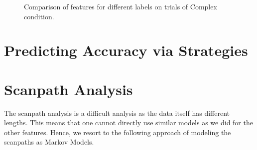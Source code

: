 \begin{figure}
\begin{floatrow}
{    \caption{Comparison of features for different labels on trials of Complex condition.}
    \label{fig:barchart_complex}
}
\end{floatrow}
\begin{floatrow}
\end{floatrow}
\end{figure}


\section{Predicting Accuracy via Strategies}
\label{sec:predicting_accuracy_strategies}










\section{Scanpath Analysis}
\label{sec:scanpath_analysis}
The scanpath analysis is a difficult analysis as the data itself has different lengths. This means that one cannot directly use similar models as we did for the other features. Hence, we resort to the following approach of modeling the scanpaths as Markov Models.



